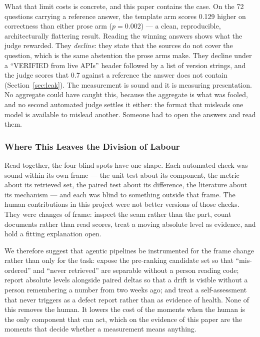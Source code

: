\documentclass[acmsmall,review,anonymous,screen]{acmart}
\begin{document}
What that limit costs is concrete, and this paper contains the case. On the 72
questions carrying a reference answer, the template arm scores 0.129 higher on
correctness than either prose arm ($p=0.002$) --- a clean, reproducible,
architecturally flattering result. Reading the winning answers shows what the
judge rewarded. They \emph{decline}: they state that the sources do not cover
the question, which is the same abstention the prose arms make. They decline
under a ``VERIFIED from live APIs'' header followed by a list of version
strings, and the judge scores that 0.7 against a reference the answer does not
contain (Section~\ref{sec:leak}). The measurement is sound and it is measuring
presentation. No aggregate could have caught this, because the aggregate is what
was fooled, and no second automated judge settles it either: the format that
misleads one model is available to mislead another. Someone had to open the
answers and read them.

\subsubsection{Where This Leaves the Division of Labour}

Read together, the four blind spots have one shape. Each automated check was
sound within its own frame --- the unit test about its component, the metric
about its retrieved set, the paired test about its difference, the literature
about its mechanism --- and each was blind to something outside that frame. The
human contributions in this project were not better versions of those checks.
They were changes of frame: inspect the seam rather than the part, count
documents rather than read scores, treat a moving absolute level as evidence,
and hold a fitting explanation open.

We therefore suggest that agentic pipelines be instrumented for the frame
change rather than only for the task: expose the pre-ranking candidate set so
that ``mis-ordered'' and ``never retrieved'' are separable without a person
reading code; report absolute levels alongside paired deltas so that a drift is
visible without a person remembering a number from two weeks ago; and treat a
self-assessment that never triggers as a defect report rather than as evidence
of health. None of this removes the human. It lowers the cost of the moments
when the human is the only component that can act, which on the evidence of
this paper are the moments that decide whether a measurement means anything.
\end{document}
